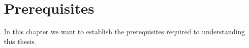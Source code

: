 \section{Prerequisites}

In this chapter we want to establish the prerequisites required to understanding this thesis.



